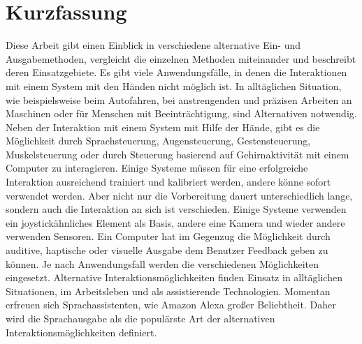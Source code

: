 \chapter{Kurzfassung}
Diese Arbeit gibt einen Einblick in verschiedene alternative Ein- und Ausgabemethoden, vergleicht die einzelnen Methoden miteinander und beschreibt deren Einsatzgebiete.
\newline \newline
Es gibt viele Anwendungsfälle, in denen die Interaktionen mit einem System mit den
Händen nicht möglich ist. In alltäglichen Situation, wie beispielsweise beim Autofahren,
bei anstrengenden und präzisen Arbeiten an Maschinen oder für Menschen mit
\mbox{Beeinträchtigung}, sind Alternativen notwendig.
\newline \newline
Neben der Interaktion mit einem System mit Hilfe der Hände, gibt es die \mbox{Möglichkeit} durch Sprachsteuerung, Augensteuerung, Gestensteuerung, Muskelsteuerung oder durch Steuerung basierend auf Gehirnaktivität mit einem Computer zu interagieren. Einige Systeme müssen für eine erfolgreiche Interaktion ausreichend trainiert und kalibriert werden, andere könne sofort verwendet werden. Aber nicht nur die Vorbereitung dauert unterschiedlich lange, sondern auch die Interaktion an sich ist verschieden. Einige Systeme verwenden ein joystickähnliches Element als Basis, andere eine Kamera und wieder andere verwenden Sensoren.
\newline \newline
Ein Computer hat im Gegenzug die Möglichkeit durch auditive, haptische oder visuelle Ausgabe dem Benutzer Feedback geben zu können. Je nach Anwendungsfall werden die verschiedenen Möglichkeiten eingesetzt.
\newline \newline
Alternative Interaktionsmöglichkeiten finden Einsatz in alltäglichen Situationen, im Arbeitsleben und als assistierende Technologien. Momentan erfreuen sich Sprachassistenten, wie Amazon Alexa großer Beliebtheit. Daher wird die Sprachausgabe als die populärste Art der alternativen Interaktionsmöglichkeiten definiert.
 
